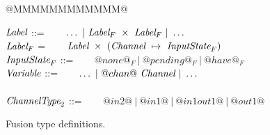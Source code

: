 
\begin{figure}

\begin{tabbing}
@MMMMMMMMMMMM@   \TABDEF \kill

$\textit{Label}$        \> ::=  \> ~~~ $\ldots ~|~\textit{Label}_F~\times~\textit{Label}_F ~|~ \ldots$ \\
$\textit{Label}_F$      \> =    \> ~~~ $\textit{Label}~\times~(\textit{Channel} ~\mapsto~ \textit{InputState}_F)$  \\
$\textit{InputState}_F$ \> ::=  \> ~~~ $@none@_F ~|~ @pending@_F ~|~ @have@_F$    \\
$\textit{Variable}$          \> ::=  \> ~~~ $\ldots ~|~@chan@~\textit{Channel} ~|~ \ldots$ \\
\\

$\textit{ChannelType}_2$   \> ::=  \> ~~~ $@in2@~|~@in1@~|~@in1out1@~|~@out1@$
\end{tabbing}

\caption{Fusion type definitions.}
\label{fig:Fusion:Types}
\end{figure}


